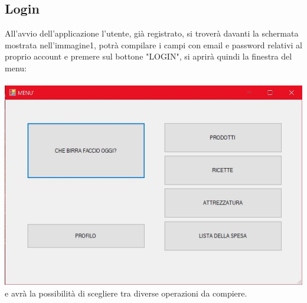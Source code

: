 \documentclass[a4paper, titlepage]{article}
\begin{document}
\subsection{Login}
All'avvio dell'applicazione l'utente, già registrato, si troverà davanti la schermata mostrata nell'immagine1, potrà compilare i campi con email e password relativi al proprio account e premere sul bottone "LOGIN", si aprirà quindi la finestra del menu:\\\\
\includegraphics[scale=0.30]{Immagini/form/Form Menu.jpg}
\\e avrà la possibilità di scegliere tra diverse operazioni da compiere.
\end{document}
